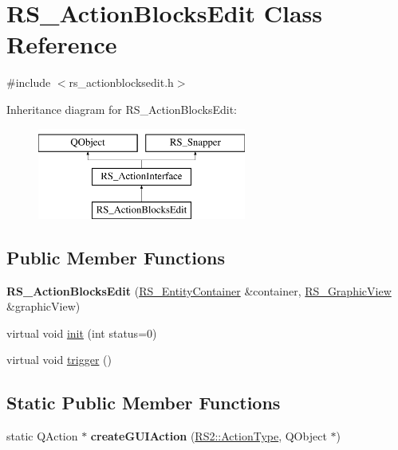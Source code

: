 \hypertarget{classRS__ActionBlocksEdit}{\section{R\-S\-\_\-\-Action\-Blocks\-Edit Class Reference}
\label{classRS__ActionBlocksEdit}
}


{\ttfamily \#include $<$rs\-\_\-actionblocksedit.\-h$>$}

Inheritance diagram for R\-S\-\_\-\-Action\-Blocks\-Edit\-:\begin{figure}[H]
\begin{center}
\leavevmode
\includegraphics[height=3.000000cm]{classRS__ActionBlocksEdit}
\end{center}
\end{figure}
\subsection*{Public Member Functions}
\begin{DoxyCompactItemize}
\item 
\hypertarget{classRS__ActionBlocksEdit_a3713e190d57b22b5d1689f25f1495293}{{\bfseries R\-S\-\_\-\-Action\-Blocks\-Edit} (\hyperlink{classRS__EntityContainer}{R\-S\-\_\-\-Entity\-Container} \&container, \hyperlink{classRS__GraphicView}{R\-S\-\_\-\-Graphic\-View} \&graphic\-View)}\label{classRS__ActionBlocksEdit_a3713e190d57b22b5d1689f25f1495293}

\item 
virtual void \hyperlink{classRS__ActionBlocksEdit_a806dca914db084aaf5fbaa73dae452df}{init} (int status=0)
\item 
virtual void \hyperlink{classRS__ActionBlocksEdit_a8e8bbf0f43e2324761d298ed1474dcc1}{trigger} ()
\end{DoxyCompactItemize}
\subsection*{Static Public Member Functions}
\begin{DoxyCompactItemize}
\item 
\hypertarget{classRS__ActionBlocksEdit_a32a220d2c321216f4a6d1c34f6cb2a5d}{static Q\-Action $\ast$ {\bfseries create\-G\-U\-I\-Action} (\hyperlink{classRS2_afe3523e0bc41fd637b892321cfc4b9d7}{R\-S2\-::\-Action\-Type}, Q\-Object $\ast$)}\label{classRS__ActionBlocksEdit_a32a220d2c321216f4a6d1c34f6cb2a5d}

\end{DoxyCompactItemize}
